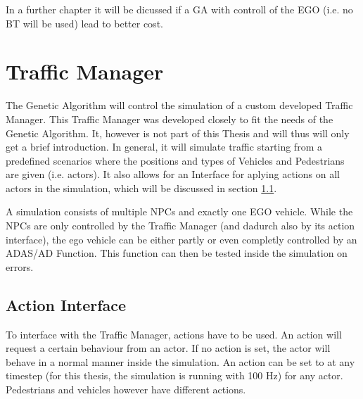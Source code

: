 In a further chapter it will be dicussed if a GA with controll of the EGO (i.e. no BT will be used) lead to better cost.



\section{Traffic Manager}
The Genetic Algorithm will control the simulation of a custom developed Traffic Manager. This Traffic Manager was developed closely to fit the needs of the Genetic Algorithm. 
It, however is not part of this Thesis and will thus will only get a brief introduction. 
In general, it will simulate traffic starting from a predefined scenarios where the positions and types of Vehicles and Pedestrians are given (i.e. actors). It also allows for an Interface for aplying actions on all actors in the simulation, which will be discussed in section \ref{implementation:action_interface}.

A simulation consists of multiple NPCs and exactly one EGO vehicle. While the NPCs are only controlled by the Traffic Manager (and dadurch also by its action interface), the ego vehicle can be either partly or even completly controlled by an ADAS/AD Function. This function can then be tested inside the simulation on errors.


\subsection{Action Interface}
\label{implementation:action_interface}
To interface with the Traffic Manager, actions have to be used. An action will request a certain behaviour from an actor. If no action is set, the actor will behave in a normal manner inside the simulation. An action can be set to at any timestep (for this thesis, the simulation is running with 100 Hz) for any actor. Pedestrians and vehicles however have different actions.

